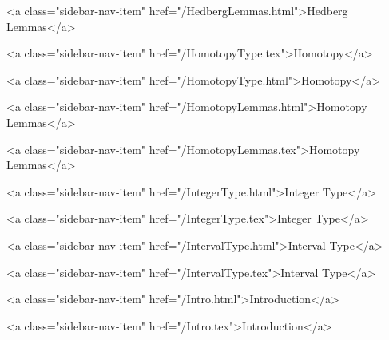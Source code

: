       
        
          <a class="sidebar-nav-item" href="/HedbergLemmas.html">Hedberg Lemmas</a>
        
      
    
      
        
          <a class="sidebar-nav-item" href="/HomotopyType.tex">Homotopy</a>
        
      
    
      
        
          <a class="sidebar-nav-item" href="/HomotopyType.html">Homotopy</a>
        
      
    
      
        
          <a class="sidebar-nav-item" href="/HomotopyLemmas.html">Homotopy Lemmas</a>
        
      
    
      
        
          <a class="sidebar-nav-item" href="/HomotopyLemmas.tex">Homotopy Lemmas</a>
        
      
    
      
        
          <a class="sidebar-nav-item" href="/IntegerType.html">Integer Type</a>
        
      
    
      
        
          <a class="sidebar-nav-item" href="/IntegerType.tex">Integer Type</a>
        
      
    
      
        
          <a class="sidebar-nav-item" href="/IntervalType.html">Interval Type</a>
        
      
    
      
        
          <a class="sidebar-nav-item" href="/IntervalType.tex">Interval Type</a>
        
      
    
      
        
          <a class="sidebar-nav-item" href="/Intro.html">Introduction</a>
        
      
    
      
        
          <a class="sidebar-nav-item" href="/Intro.tex">Introduction</a>
        
      
    
